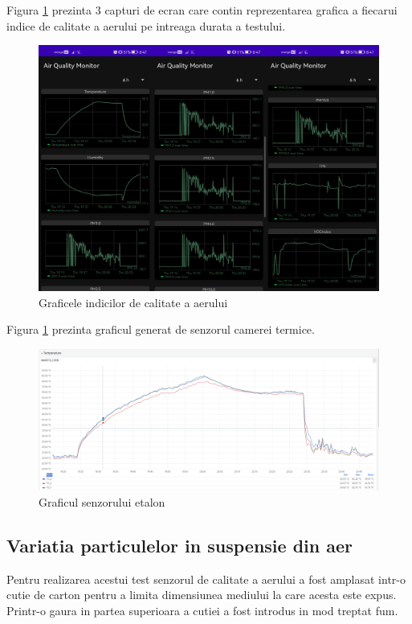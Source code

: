Figura \ref{fig:tv_temp_var_chart_view} prezinta 3 capturi de ecran care contin reprezentarea grafica a fiecarui indice de calitate a aerului pe 
intreaga durata a testului.
\begin{figure}[H]
    \centering
    \includegraphics[scale=0.18]{figs/tv_temp_var_chart_view.png}
    \caption{Graficele indicilor de calitate a aerului}
    \label{fig:tv_temp_var_chart_view}
\end{figure}

Figura \ref{fig:tv_temp_var_chart_view} prezinta graficul generat de senzorul camerei termice.
\begin{figure}[H]
    \centering
    \includegraphics[scale=0.3]{figs/tv_temp_var_waist_chart.png}
    \caption{Graficul senzorului etalon}
    \label{fig:tv_temp_var_waist_chart}
\end{figure}

\subsection{Variatia particulelor in suspensie din aer}
Pentru realizarea acestui test senzorul de calitate a aerului a fost amplasat intr-o cutie de carton pentru a limita dimensiunea mediului la care acesta este expus. 
Printr-o gaura in partea superioara a cutiei a fost introdus in mod treptat fum.

